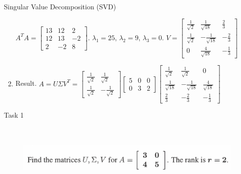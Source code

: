 \documentclass[aspectratio=169]{beamer}
\begin{document}
\begin{frame}[t]{Singular Value Decomposition (SVD)}
\begin{enumerate}
        $A^TA= \begin{bmatrix}
        13 & 12 & 2 \\
        12 & 13 & -2 \\ 
        2 & -2  & 8 
        \end{bmatrix}$. $\lambda_1 = 25$, $\lambda_2 = 9$, $\lambda_3 = 0$. $V = \begin{bmatrix}
            \frac{1}{\sqrt{2}} & \frac{1}{\sqrt{18}} & \frac{2}{3} \\
            \frac{1}{\sqrt{2}} & -\frac{1}{\sqrt{18}} & -\frac{2}{3}\\ 
            0 & \frac{4}{\sqrt{18}} & -\frac{1}{3}  
        \end{bmatrix}$
    \item Result. $A=U\Sigma V^T=\begin{bmatrix}
        \frac{1}{\sqrt{2}} & \frac{1}{\sqrt{2}}\\ 
        \frac{1}{\sqrt{2}} &  -\frac{1}{\sqrt{2}}
    \end{bmatrix}\begin{bmatrix}
    5 & 0 & 0 \\
    0 & 3 & 2 
    \end{bmatrix}\begin{bmatrix}
        \frac{1}{\sqrt{2}} & \frac{1}{\sqrt{2}} & 0 \\
        \frac{1}{\sqrt{18}} & -\frac{1}{\sqrt{18}} & \frac{4}{\sqrt{18}}\\ 
        \frac{2}{3} & -\frac{2}{3} & -\frac{1}{3}  
    \end{bmatrix}$
    \end{enumerate}
\end{frame}

\begin{frame}[t]{Task 1}
    \framesubtitle{}
    \vspace{-0.5cm}
    \begin{figure}[H]
        \centering\includegraphics[height=3cm,width=1\textwidth,keepaspectratio]{1.png}
        \label{fig:1.png}
    \end{figure}
\end{frame}
\end{document}
